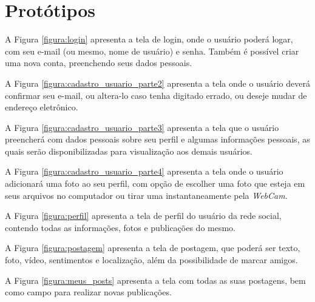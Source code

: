 \chapter{Protótipos}

A Figura \ref{figura:login} apresenta a tela de login, onde o usuário poderá logar, com seu e-mail (ou mesmo, nome de usuário) e senha. Também é possível criar uma nova conta, preenchendo seus dados pessoais.


A Figura \ref{figura:cadastro_usuario_parte2} apresenta a tela onde o usuário deverá confirmar seu e-mail, ou altera-lo caso tenha digitado errado, ou deseje mudar de endereço eletrônico.


A Figura \ref{figura:cadastro_usuario_parte3} apresenta a tela que o usuário preencherá com dados pessoais sobre seu perfil e algumas informações pessoais, as quais serão disponibilizadas para visualização aos demais usuários.


A Figura \ref{figura:cadastro_usuario_parte4} apresenta a tela onde o usuário adicionará uma foto ao seu perfil, com opção de escolher uma foto que esteja em seus arquivos no computador ou tirar uma instantaneamente pela \textit{WebCam}.


A Figura \ref{figura:perfil} apresenta a tela de perfil do usuário da rede social, contendo todas as informações, fotos e publicações do mesmo.


A Figura \ref{figura:postagem} apresenta a tela de postagem, que poderá ser texto, foto, vídeo, sentimentos e localização, além da possibilidade de marcar amigos.


A Figura \ref{figura:meus_posts} apresenta a tela com todas as suas postagens, bem como campo para realizar novas publicações.

